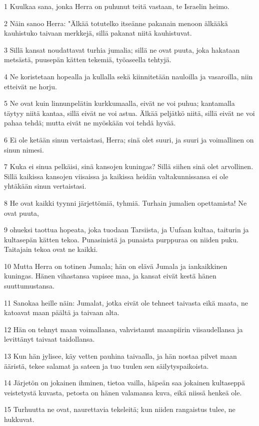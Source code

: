 \par 1 Kuulkaa sana, jonka Herra on puhunut teitä vastaan, te Israelin heimo.
\par 2 Näin sanoo Herra: "Älkää totutelko itseänne pakanain menoon älkääkä kauhistuko taivaan merkkejä, sillä pakanat niitä kauhistuvat.
\par 3 Sillä kansat noudattavat turhia jumalia; sillä ne ovat puuta, joka hakataan metsästä, puusepän kätten tekemiä, työaseella tehtyjä.
\par 4 Ne koristetaan hopealla ja kullalla sekä kiinnitetään nauloilla ja vasaroilla, niin etteivät ne horju.
\par 5 Ne ovat kuin linnunpelätin kurkkumaalla, eivät ne voi puhua; kantamalla täytyy niitä kantaa, sillä eivät ne voi astua. Älkää peljätkö niitä, sillä eivät ne voi pahaa tehdä; mutta eivät ne myöskään voi tehdä hyvää.
\par 6 Ei ole ketään sinun vertaistasi, Herra; sinä olet suuri, ja suuri ja voimallinen on sinun nimesi.
\par 7 Kuka ei sinua pelkäisi, sinä kansojen kuningas? Sillä siihen sinä olet arvollinen. Sillä kaikissa kansojen viisaissa ja kaikissa heidän valtakunnissansa ei ole yhtäkään sinun vertaistasi.
\par 8 He ovat kaikki tyynni järjettömiä, tyhmiä. Turhain jumalien opettamista! Ne ovat puuta,
\par 9 ohueksi taottua hopeata, joka tuodaan Tarsiista, ja Uufaan kultaa, taiturin ja kultasepän kätten tekoa. Punasinistä ja punaista purppuraa on niiden puku. Taitajain tekoa ovat ne kaikki.
\par 10 Mutta Herra on totinen Jumala; hän on elävä Jumala ja iankaikkinen kuningas. Hänen vihastansa vapisee maa, ja kansat eivät kestä hänen suuttumustansa.
\par 11 Sanokaa heille näin: Jumalat, jotka eivät ole tehneet taivasta eikä maata, ne katoavat maan päältä ja taivaan alta.
\par 12 Hän on tehnyt maan voimallansa, vahvistanut maanpiirin viisaudellansa ja levittänyt taivaat taidollansa.
\par 13 Kun hän jylisee, käy vetten pauhina taivaalla, ja hän nostaa pilvet maan ääristä, tekee salamat ja sateen ja tuo tuulen sen säilytyspaikoista.
\par 14 Järjetön on jokainen ihminen, tietoa vailla, häpeän saa jokainen kultaseppä veistetystä kuvasta, petosta on hänen valamansa kuva, eikä niissä henkeä ole.
\par 15 Turhuutta ne ovat, naurettavia tekeleitä; kun niiden rangaistus tulee, ne hukkuvat.
